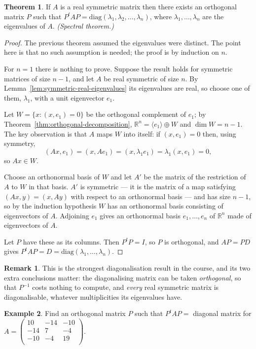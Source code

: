 \documentclass[11pt,a4paper]{article}
\theoremstyle{definition}
\newtheorem{thm}{Theorem}[subsection]
\newtheorem{exa}[thm]{Example}
\newtheorem*{remark}{Remark}
\begin{document}
\begin{thm}
If $A$ is a real symmetric matrix then there exists an orthogonal matrix $P$
such that $P^tAP=\text{diag}(\lambda_1,\lambda_2,\dots,\lambda_n)$, where
$\lambda_1,\dots,\lambda_n$ are the eigenvalues of $A$. \emph{(Spectral
theorem.)}
\end{thm}

\begin{proof}
The previous theorem assumed the eigenvalues were distinct. The point here is
that no such assumption is needed; the proof is by induction on $n$.

For $n=1$ there is nothing to prove. Suppose the result holds for symmetric
matrices of size $n-1$, and let $A$ be real symmetric of size $n$. By
Lemma~\ref{lem:symmetric-real-eigenvalues} its eigenvalues are real, so choose
one of them, $\lambda_1$, with a unit eigenvector $e_1$.

Let $W=\{x:(x,e_1)=0\}$ be the orthogonal complement of $e_1$; by
Theorem~\ref{thm:orthogonal-decomposition}, $\mathbb{R}^n=\langle e_1\rangle
\oplus W$ and $\dim W=n-1$. The key observation is that $A$ maps $W$ into
itself: if $(x,e_1)=0$ then, using symmetry,
$$(Ax,e_1)=(x,Ae_1)=(x,\lambda_1e_1)=\lambda_1(x,e_1)=0,$$
so $Ax\in W$.

Choose an orthonormal basis of $W$ and let $A'$ be the matrix of the
restriction of $A$ to $W$ in that basis. $A'$ is symmetric --- it is the matrix
of a map satisfying $(Ax,y)=(x,Ay)$ with respect to an orthonormal basis --- and
has size $n-1$, so by the induction hypothesis $W$ has an orthonormal basis
consisting of eigenvectors of $A$. Adjoining $e_1$ gives an orthonormal basis
$e_1,\dots,e_n$ of $\mathbb{R}^n$ made of eigenvectors of $A$.

Let $P$ have these as its columns. Then $P^tP=I$, so $P$ is orthogonal, and
$AP=PD$ gives $P^tAP=D=\text{diag}(\lambda_1,\dots,\lambda_n)$.
\end{proof}

\begin{remark}
This is the strongest diagonalisation result in the course, and its two extra
conclusions matter: the diagonalising matrix can be taken \emph{orthogonal}, so
that $P^{-1}$ costs nothing to compute, and \emph{every} real symmetric matrix
is diagonalisable, whatever multiplicities its eigenvalues have.
\end{remark}


\begin{exa}
Find an orthogonal matrix $P$ such that $P^tAP=$ diagonal matrix for $A=
\begin{pmatrix}
10&-14&-10\\-14&7&-4\\-10&-4&19\\
\end{pmatrix}
$.
\end{exa}
\end{document}
